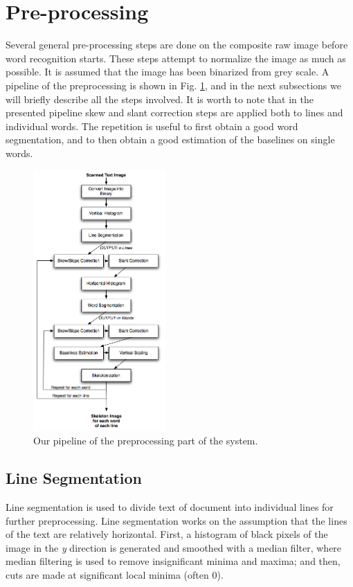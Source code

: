 \documentclass[conference]{IEEEtran}
\begin{document}
\section{Pre-processing} \label{sectP}
Several general pre-processing steps are done on the composite raw image before word recognition starts. These steps attempt to normalize the image as much as possible. It is assumed that the image has been binarized from grey scale. 
A pipeline of the preprocessing is shown in Fig. \ref{fig:pipelinePP}, and in the next subsections we will briefly describe all the steps involved. It is worth to note that in the presented pipeline skew and slant correction steps are applied both to lines and individual words. The repetition is useful to first obtain a good word segmentation, and to then obtain a good estimation of the baselines on single words.
\begin{figure}
 \centering
\includegraphics[width=0.45\textwidth]{preprocessing_pipeline.png}
\caption{Our pipeline of the preprocessing part of the system.}
\label{fig:pipelinePP}
\end{figure}
\subsection{Line Segmentation}
Line segmentation is used to divide text of document into individual lines for further preprocessing. Line segmentation works on the assumption that the lines of the text are relatively horizontal. First, a histogram of black pixels of the image in the \textit{y} direction is generated and smoothed with a median filter, where median filtering is used to remove insignificant minima and maxima; and then, cuts are made at significant local minima (often 0).
\end{document}

